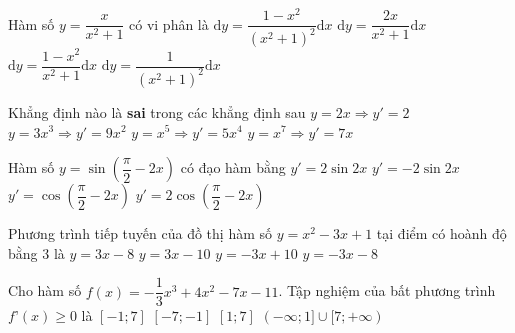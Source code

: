 \begin{ex}%
	Hàm số $y = \dfrac{x}{x^2 + 1}$ có vi phân là
	\choice
	{\True $\text{d}y = \dfrac{1 - x^2}{(x^2 + 1)^2}\text{d}x$}
	{$\text{d}y = \dfrac{2x}{x^2 + 1}\text{d}x$}
	{$\text{d}y = \dfrac{1 - x^2}{x^2 + 1}\text{d}x$}
	{$\text{d}y = \dfrac{1}{(x^2 + 1)^2}\text{d}x$}
	\end{ex}
	
\begin{ex}%
	Khẳng định nào là \textbf{sai} trong các khẳng định sau
	\choice
	{$y = 2x \Rightarrow y' = 2$}
	{$y = 3x^3 \Rightarrow y' = 9x^2$}
	{$y = x^5 \Rightarrow y' = 5x^4$}
	{\True $y = x^7 \Rightarrow y' = 7x$}
	\end{ex}
	
\begin{ex}%
	Hàm số $y = \sin \left( \dfrac{\pi }{2} - 2x \right)$ có đạo hàm bằng
	\choice
	{$y' = 2\sin 2x$}
	{\True $y' =  - 2\sin 2x$}
	{$y' = \cos \left( \dfrac{\pi }{2} - 2x \right)$}
	{$y' = 2\cos \left( \dfrac{\pi }{2} - 2x \right)$}
	\end{ex}
	
\begin{ex}%
	Phương trình tiếp tuyến của đồ thị hàm số $y = x^2 - 3x + 1$ tại điểm có hoành độ bằng $3$ là 
	\choice
	{\True $y = 3x - 8$}
	{$y = 3x - 10$}
	{$y =  - 3x + 10$}
	{$y =  - 3x - 8$}
	\end{ex}
	
\begin{ex}%
	Cho hàm số $f(x) = - \dfrac{1}{3}x^3 + 4x^2 - 7x - 11$. Tập nghiệm của bất phương trình $f’(x) \geqslant 0$ là
	\choice
	{$\left[  - 1;7 \right]$}
	{$\left[ - 7; - 1 \right]$}
	{\True $\left[ 1;7 \right]$}
	{$( - \infty ;1] \cup [7; + \infty )$}
	\end{ex}
	
